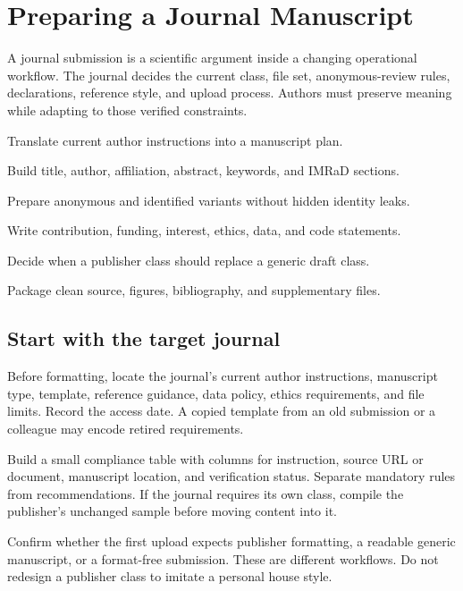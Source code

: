 \chapter{Preparing a Journal Manuscript}
\label{chap:journal}

A journal submission is a scientific argument inside a changing operational
workflow. The journal decides the current class, file set, anonymous-review
rules, declarations, reference style, and upload process. Authors must preserve
meaning while adapting to those verified constraints.

\begin{learningoutcomes}
  \item Translate current author instructions into a manuscript plan.
  \item Build title, author, affiliation, abstract, keywords, and IMRaD sections.
  \item Prepare anonymous and identified variants without hidden identity leaks.
  \item Write contribution, funding, interest, ethics, data, and code statements.
  \item Decide when a publisher class should replace a generic draft class.
  \item Package clean source, figures, bibliography, and supplementary files.
\end{learningoutcomes}

\section{Start with the target journal}

Before formatting, locate the journal's current author instructions, manuscript
type, template, reference guidance, data policy, ethics requirements, and file
limits. Record the access date. A copied template from an old submission or a
colleague may encode retired requirements.

Build a small compliance table with columns for instruction, source URL or
document, manuscript location, and verification status. Separate mandatory
rules from recommendations. If the journal requires its own class, compile the
publisher's unchanged sample before moving content into it.

\begin{submissioncheck}
Confirm whether the first upload expects publisher formatting, a readable
generic manuscript, or a format-free submission. These are different workflows.
Do not redesign a publisher class to imitate a personal house style.
\end{submissioncheck}

